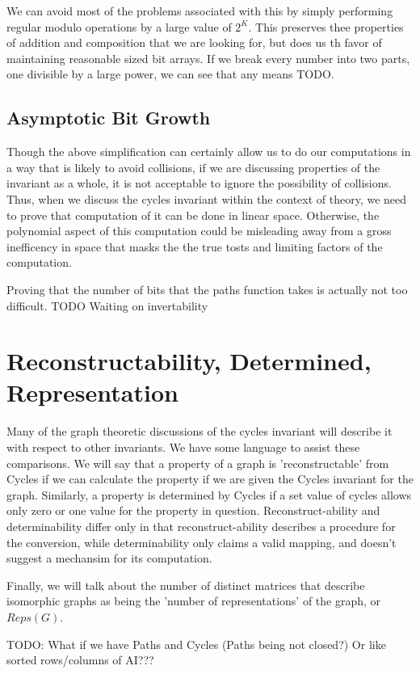 \documentclass[11pt,a4paper]{report}
\begin{document}
We can avoid most of the problems associated with this by simply performing regular modulo operations by a large value of $2^K$.
This preserves thee properties of addition and composition that we are looking for, but does us th favor of maintaining reasonable sized bit arrays.
If we break every number into two parts, one divisible by a large power, we can see that any means TODO.

\subsection{Asymptotic Bit Growth}
Though the above simplification can certainly allow us to do our computations in a way that is likely to avoid collisions, if we are discussing properties of the invariant as a whole, it is not acceptable to ignore the possibility of collisions.
Thus, when we discuss the cycles invariant within the context of theory, we need to prove that computation of it can be done in linear space.
Otherwise, the polynomial aspect of this computation could be misleading away from a gross inefficency in space that masks the the true tosts and limiting factors of the computation.

Proving that the number of bits that the paths function takes is actually not too difficult.
TODO Waiting on invertability

\section{Reconstructability, Determined, Representation}
Many of the graph theoretic discussions of the cycles invariant will describe it with respect to other invariants. We have some language to assist these comparisons.
We will say that a property of a graph is 'reconstructable' from Cycles if we can calculate the property if we are given the Cycles invariant for the graph.
Similarly, a property is determined by Cycles if a set value of cycles allows only zero or one value for the property in question.
Reconstruct-ability and determinability differ only in that reconstruct-ability describes a procedure for the conversion, while determinability only claims a valid mapping, and doesn't suggest a mechansim for its computation.

Finally, we will talk about the number of distinct matrices that describe isomorphic graphs as being the 'number of representations' of the graph, or $Reps(G)$.

TODO: What if we have Paths and Cycles (Paths being not closed?) Or like sorted rows/columns of AI???
\end{document}
